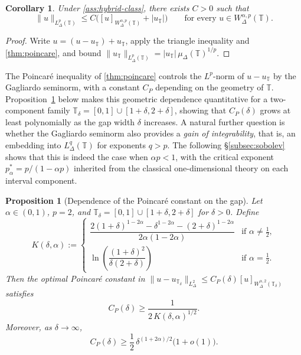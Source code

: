 \documentclass[11pt,a4paper]{article}
\numberwithin{equation}{section}
\newtheorem{proposition}[proposition]{Proposition}
\newtheorem{corollary}[corollary]{Corollary}
\theoremstyle{definition}
\newcommand{\T}{\mathbb{T}}
\begin{document}
\begin{corollary}\label{cor:coercive-mod-constants}
Under \cref{ass:hybrid-class}, there exists $C>0$ such that
\[
\|u\|_{L^p_{\Delta}(\T)}
\le
C\Big(
[u]_{W^{\alpha,p}_{\Delta}(\T)}
+
|u_{\T}|
\Big)
\qquad
\text{for every }u\in W^{\alpha,p}_{\Delta}(\T).
\]
\end{corollary}

\begin{proof}
Write $u=(u-u_{\T})+u_{\T}$, apply the triangle inequality and
\cref{thm:poincare}, and bound
$\|u_{\T}\|_{L^p_\Delta(\T)}=|u_{\T}|\,\mu_\Delta(\T)^{1/p}$.
\end{proof}

The Poincar\'e inequality of \cref{thm:poincare} controls the $L^p$-norm
of $u-u_\T$ by the Gagliardo seminorm, with a constant $C_P$ depending
on the geometry of $\T$. Proposition~\ref{prop:poincare-gap} below makes
this geometric dependence quantitative for a two-component family
$\T_\delta=[0,1]\cup[1+\delta,2+\delta]$, showing that $C_P(\delta)$
grows at least polynomially as the gap width $\delta$ increases.
A natural further question is whether the Gagliardo seminorm also
provides a \emph{gain of integrability}, that is, an embedding into
$L^q_\Delta(\T)$ for exponents $q>p$. The following
\S\ref{subsec:sobolev} shows that this is indeed the case when
$\alpha p<1$, with the critical exponent
$p^*_\alpha=p/(1-\alpha p)$ inherited from the classical
one-dimensional theory on each interval component.

\begin{proposition}[Dependence of the Poincar\'e constant on the gap]
\label{prop:poincare-gap}
Let $\alpha\in(0,1)$, $p=2$, and
$\T_\delta=[0,1]\cup[1+\delta,2+\delta]$ for $\delta>0$. Define
\[
K(\delta,\alpha) :=
\begin{cases}
\dfrac{2(1+\delta)^{1-2\alpha}-\delta^{1-2\alpha}-(2+\delta)^{1-2\alpha}}
{2\alpha(1-2\alpha)}
& \text{if }\alpha\neq\tfrac{1}{2},\\[8pt]
\ln\!\left(\dfrac{(1+\delta)^2}{\delta(2+\delta)}\right)
& \text{if }\alpha=\tfrac{1}{2}.
\end{cases}
\]
Then the optimal Poincar\'e constant in
$\|u-u_{\T_\delta}\|_{L^2_\Delta}\le C_P(\delta)[u]_{W^{\alpha,2}_\Delta(\T_\delta)}$
satisfies
\begin{equation}\label{eq:poincare-lower}
C_P(\delta) \ge \frac{1}{2\,K(\delta,\alpha)^{1/2}}.
\end{equation}
Moreover, as $\delta\to\infty$,
\begin{equation}\label{eq:poincare-blowup}
C_P(\delta) \ge \frac{1}{2}\,\delta^{(1+2\alpha)/2}\bigl(1+o(1)\bigr).
\end{equation}
\end{proposition}
\end{document}
